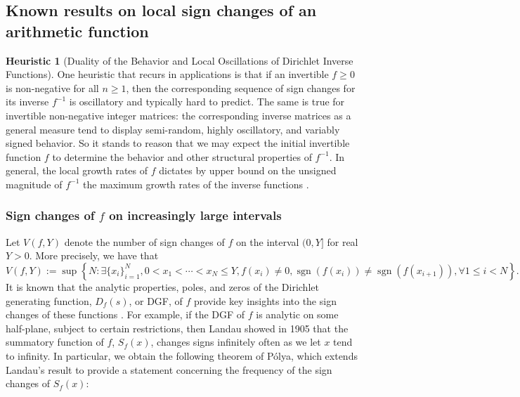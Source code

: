 \documentclass[11pt,reqno]{amsart}
\numberwithin{figure}{section}
\numberwithin{table}{section}
\DeclareMathOperator{\sgn}{sgn}
\theoremstyle{plain}
\numberwithin{theorem}{section}
\theoremstyle{definition}
\newtheorem{heuristic}[theorem]{Heuristic}
\begin{document}
\subsection{Known results on local sign changes of an arithmetic function} 

\begin{heuristic}[Duality of the Behavior and Local Oscillations of Dirichlet Inverse Functions]
One heuristic that recurs in applications is that if an 
invertible $f \geq 0$ is non-negative for all $n \geq 1$, then the corresponding 
sequence of sign changes for its inverse $f^{-1}$ is oscillatory and typically 
hard to predict. The same is true for invertible non-negative integer matrices: 
the corresponding inverse matrices as a general measure tend to display 
semi-random, highly oscillatory, and variably signed behavior. So it stands to reason 
that we may expect the initial invertible function $f$ to determine the behavior and other 
structural properties of $f^{-1}$. In general, the local growth rates of $f$ dictates by 
upper bound on the unsigned magnitude of $f^{-1}$ the maximum growth rates of the inverse 
functions \cite{DIRINVFUNC-GROWTH-PROPS}. 
\end{heuristic} 

\subsubsection{Sign changes of $f$ on increasingly large intervals} 

Let $V(f, Y)$ denote the number of sign changes of $f$ on the interval $(0, Y]$ for 
real $Y > 0$. 
More precisely, we have that 
\[
V(f, Y) := \sup \left\{N: \exists \{x_i\}_{i=1}^N, 0<x_1<\cdots<x_N \leq Y, 
     f(x_i) \neq 0, \sgn(f(x_i)) \neq \sgn(f(x_{i+1})), \forall 1 \leq i < N\right\}. 
\]
It is known that the analytic properties, poles, and zeros of the 
Dirichlet generating function, $D_f(s)$, or DGF, of $f$ provide key insights into the 
sign changes of these functions \cite{OSCPROPS-ARITHFUNCSI}. 
For example, if the DGF of $f$ is analytic on some half-plane, subject to certain 
restrictions, then Landau showed in 1905 that 
the summatory function of $f$, $S_f(x)$, changes signs infinitely often as we let 
$x$ tend to infinity. In particular, we 
obtain the following theorem of P\'olya, which extends Landau's result to provide a 
statement concerning the frequency of the sign changes of $S_f(x)$: 
\end{document}

